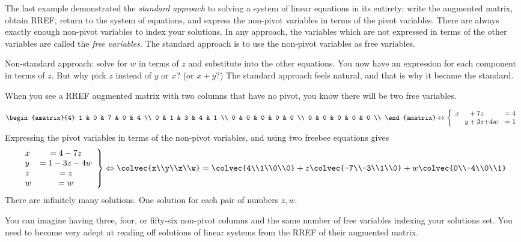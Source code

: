 The last example demonstrated the \hypertarget{standard approach}{{\itshape standard approach}} to solving a system of linear equations in its entirety: write the augmented matrix, obtain RREF, return to the system of equations, and express the non-pivot variables in terms of the pivot variables. 
There are always exactly enough non-pivot variables to index your solutions. 
In any approach, the variables which are not expressed in terms of the other variables are called the {\itshape free variables}. The standard approach is to use the non-pivot variables as free variables.

Non-standard approach: solve for $w$ in terms of $z$ and substitute into the other equations. You now have an expression for each component in terms of $z$. But why pick $z$ instead of $y$ or $x$? (or $x+y$?) The standard approach feels natural, and that is why it became the standard.

When you see a RREF augmented matrix with two columns that have no pivot, you know there will be two free variables. 

\begin{example}
\[
 \begin{amatrix}{4} 
1 & 0 & 7 & 0 & 4 \\ 
0 & 1 & 3 & 4 & 1 \\ 
0 & 0 & 0 & 0 & 0 \\ 
0 & 0 & 0 & 0 & 0 \\ 
\end{amatrix}
\Leftrightarrow
\left\{
\begin{array}{lcr}
	x \phantom{+y}    + 7z  \phantom{+w} & = 4 \\
	\phantom {x+}   y + 3z  {+4w} & = 1 \\
     \end{array}
     \right.
\]
Expressing the pivot variables in terms of the non-pivot variables, and using two freebee equations gives
\[
\left.
\begin{array}{lcr}
	x & = 4 -7z \\
	 y  & = 1 -3z-4w\\
	 z         & = z\\
	w & =w          
     \end{array}
     \right\}
     \Leftrightarrow
\colvec{x\\y\\z\\w} = \colvec{4\\1\\0\\0} + z\colvec{-7\\-3\\1\\0} + w\colvec{0\\-4\\0\\1}
\]
There are infinitely many solutions. One solution for each pair of numbers $z,w$. 
\end{example}
You can imagine having three, four, or fifty-six non-pivot columns and the same number of free variables indexing your solutions set. You need to become very adept at reading off solutions of linear systems from the RREF
of their augmented matrix. 

